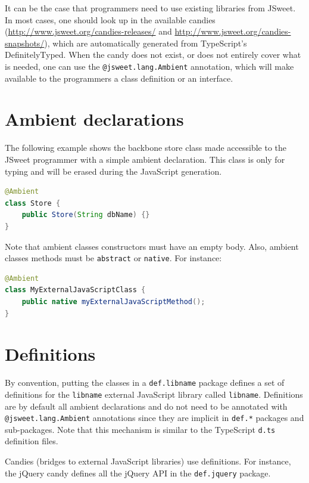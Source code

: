 \documentclass[a4paper]{report}
\begin{document}
It can be the case that programmers need to use existing libraries from JSweet. In most cases, one should look up in the available candies (\url{http://www.jsweet.org/candies-releases/} and \url{http://www.jsweet.org/candies-snapshots/}), which are automatically generated from TypeScript's DefinitelyTyped. When the candy does not exist, or does not entirely cover what is needed, one can use the \texttt{@jsweet.lang.Ambient} annotation, which will make available to the programmers a class definition or an interface. 

\section{Ambient declarations}

The following example shows the backbone store class made accessible to the JSweet programmer with a simple ambient declaration. This class is only for typing and will be erased during the JavaScript generation.

\begin{lstlisting}[language=Java]
@Ambient
class Store {
	public Store(String dbName) {}
}
\end{lstlisting}

Note that ambient classes constructors must have an empty body. Also, ambient classes methods must be \texttt{abstract} or \texttt{native}. For instance:

\begin{lstlisting}[language=Java]
@Ambient
class MyExternalJavaScriptClass {
	public native myExternalJavaScriptMethod();
}
\end{lstlisting}

\section{Definitions}

By convention, putting the classes in a \texttt{def.libname} package defines a set of definitions for the \texttt{libname} external JavaScript library called \texttt{libname}. Definitions are by default all ambient declarations and do not need to be annotated with \texttt{@jsweet.lang.Ambient} annotations since they are implicit in \texttt{def.*} packages and sub-packages. Note that this mechanism is similar to the TypeScript \texttt{d.ts} definition files.

Candies (bridges to external JavaScript libraries) use definitions. For instance, the jQuery candy defines all the jQuery API in the \texttt{def.jquery} package.
\end{document}
